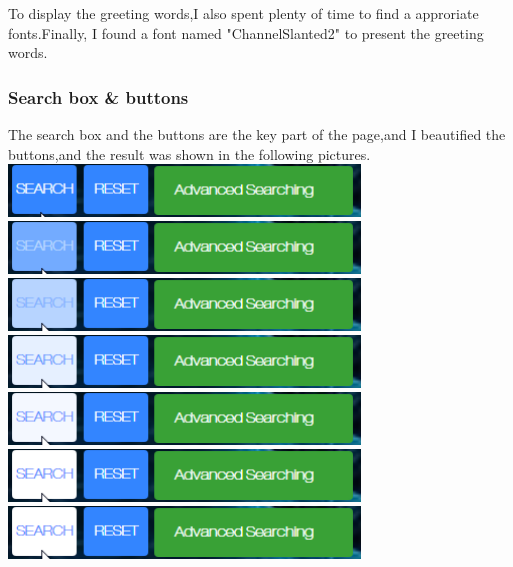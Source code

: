 \documentclass[10pt,twoside,a4paper,titlepage]{article}
\begin{document}
	To display the greeting words,I also spent plenty of time to find a approriate fonts.Finally, I found a font named "ChannelSlanted2" to present the greeting words.
	
	\subsubsection{Search box \& buttons}
	
	The search box and the buttons are the key part of the page,and I beautified the buttons,and the result was shown in the following pictures.
	\newline
	\newline
	\includegraphics[width=0.7\textwidth]{cyf/search1.png}
	\newline
	\includegraphics[width=0.7\textwidth]{cyf/search2.png}
	\newline
 	\includegraphics[width=0.7\textwidth]{cyf/search3.png}
 	\newline	
 	\includegraphics[width=0.7\textwidth]{cyf/search4.png}
 	\newline	
 	\includegraphics[width=0.7\textwidth]{cyf/search5.png}
 	\newline	
 	\includegraphics[width=0.7\textwidth]{cyf/search6.png}
 	\newline	
 	\includegraphics[width=0.7\textwidth]{cyf/search7.png}
\end{document}
